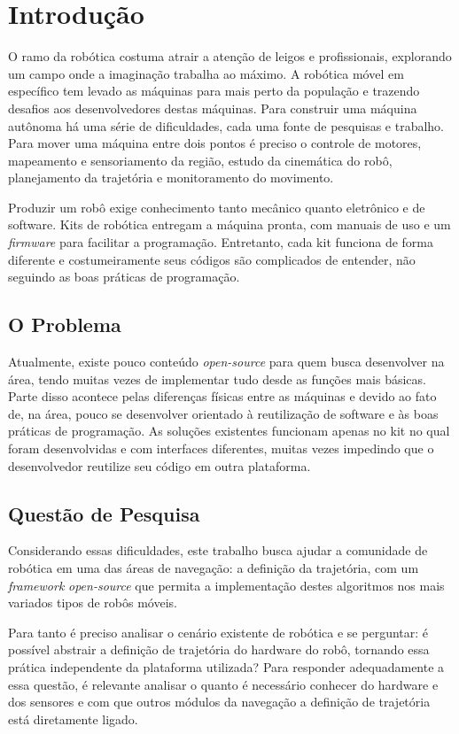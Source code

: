 
\chapter[Introdução]{Introdução}

O ramo da robótica costuma atrair a atenção de leigos e profissionais, explorando um campo onde a imaginação trabalha ao máximo. A robótica móvel em específico tem levado as máquinas para mais perto da população e trazendo desafios aos desenvolvedores destas máquinas. Para construir uma máquina autônoma há uma série de dificuldades, cada uma fonte de pesquisas e trabalho. Para mover uma máquina entre dois pontos é preciso o controle de motores, mapeamento e sensoriamento da região, estudo da cinemática do robô, planejamento da trajetória e monitoramento do movimento.

Produzir um robô exige conhecimento tanto mecânico quanto eletrônico e de software. Kits de robótica entregam a máquina pronta, com manuais de uso e um \textit{firmware} para facilitar a programação. Entretanto, cada kit funciona de forma diferente e costumeiramente seus códigos são complicados de entender, não seguindo as boas práticas de programação.

\section{O Problema}

Atualmente, existe pouco conteúdo \textit{open-source} para quem busca desenvolver na área, tendo muitas vezes de implementar tudo desde as funções mais básicas. Parte disso acontece pelas diferenças físicas entre as máquinas e devido ao fato de, na área, pouco se desenvolver orientado à reutilização de software e às boas práticas de programação. As soluções existentes funcionam apenas no kit no qual foram desenvolvidas e com interfaces diferentes, muitas vezes impedindo que o desenvolvedor reutilize seu código em outra plataforma.

\section{Questão de Pesquisa}

Considerando essas dificuldades, este trabalho busca ajudar a comunidade de robótica em uma das áreas de navegação: a definição da trajetória, com um \textit{framework} \textit{open-source} que permita a implementação destes algoritmos nos mais variados tipos de robôs móveis.

Para tanto é preciso analisar o cenário existente de robótica e se perguntar: é possível abstrair a definição de trajetória do hardware do robô, tornando essa prática independente da plataforma utilizada? Para responder adequadamente a essa questão, é relevante analisar o quanto é necessário conhecer do hardware e dos sensores e com que outros módulos da navegação a definição de trajetória está diretamente ligado.

